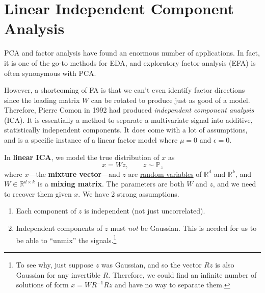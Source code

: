 \section{Linear Independent Component Analysis} 

  PCA and factor analysis have found an enormous number of applications. In fact, it is one of the go-to methods for EDA, and exploratory factor analysis (EFA) is often synonymous with PCA. 

  However, a shortcoming of FA is that we can't even identify factor directions since the loading matrix $W$ can be rotated to produce just as good of a model. Therefore, Pierre Comon in 1992 had produced \textit{independent component analysis} (ICA). It is essentially a method to separate a multivariate signal into additive, statistically independent components. It does come with a lot of assumptions, and is a specific instance of a linear factor model where $\mu = 0$ and $\epsilon = 0$. 

  \begin{definition}
    \label{def:linear-ica}
    In \textbf{linear ICA}, we model the true distribution of $x$ as 
    \begin{equation}
      x = W z, \qquad z \sim \mathbb{P}_z
    \end{equation}
    where $x$---the \textbf{mixture vector}---and $z$ are \hyperref[prob-def:random-variable]{random variables} of $\mathbb{R}^d$ and $\mathbb{R}^k$, and $W \in \mathbb{R}^{d \times k}$ is a \textbf{mixing matrix}. The parameters are both $W$ and $z$, and we need to recover them given $x$. We have 2 strong assumptions. 
    \begin{enumerate} 
      \item Each component of $z$ is independent (not just uncorrelated). 
      \item Independent components of $z$ must \textit{not} be Gaussian. This is needed for us to be able to ``unmix'' the signals.\footnote{ To see why, just suppose $z$ was Gaussian, and so the vector $Rz$ is also Gaussian for any invertible $R$. Therefore, we could find an infinite number of solutions of form $x = W R^{-1} R z$ and have no way to separate them.}
    \end{enumerate}
  \end{definition}


